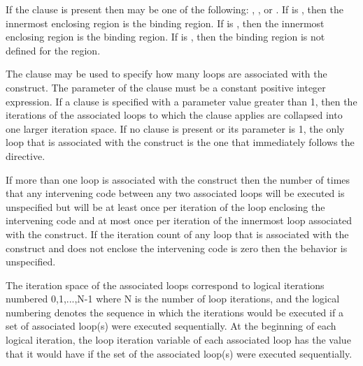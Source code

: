 If the  clause is present then  may be one of
the following: , , or . If
 is , then the innermost enclosing
 region is the binding region.  If  is
, then the innermost enclosing  region is the
binding region. If  is , then the binding
region is not defined for the  region.


The  clause may be used to specify how many loops are
associated with the  construct. The parameter of the 
clause must be a constant positive integer expression. If a 
clause is specified with a parameter value greater than 1, then the
iterations of the associated loops to which the clause applies are collapsed
into one larger iteration space. If no  clause is present or its
parameter is 1, the only loop that is associated with the  construct
is the one that immediately follows the  directive.

If more than one loop is associated with the  construct then the
number of times that any intervening code between any two associated
loops will be executed is unspecified but will be at least once per
iteration of the loop enclosing the intervening code and at most once
per iteration of the innermost loop associated with the construct. If the
iteration count of any loop that is associated with the  construct and does not
enclose the intervening code is zero then the behavior is unspecified.

The iteration space of the associated loops correspond to logical
iterations numbered 0,1,...,N-1 where N is the number of loop iterations, and
the logical numbering denotes the sequence in which the iterations would be
executed if a set of associated loop(s) were executed sequentially.  At the
beginning of each logical iteration, the loop iteration variable of each
associated loop has the value that it would have if the set of the associated
loop(s) were executed sequentially. 


